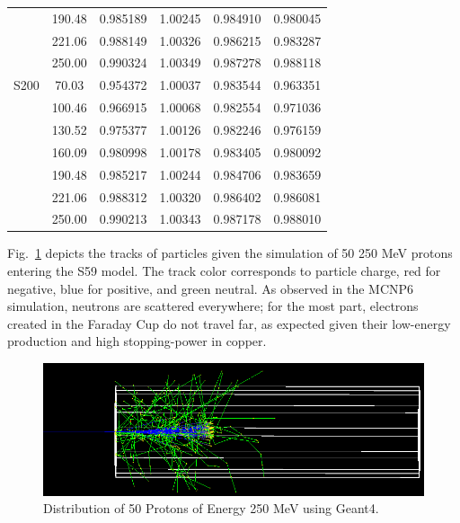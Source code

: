 \documentclass{mc2015}
\begin{document}
\begin{table}[H]
\begin{tabular}{lccccc}
        & 190.48 & \num{0.985189} & \num{1.00245} & \num{0.984910} & \num{0.980045} \\
        & 221.06 & \num{0.988149} & \num{1.00326} & \num{0.986215} & \num{0.983287} \\
        & 250.00 & \num{0.990324} & \num{1.00349} & \num{0.987278} & \num{0.988118} \\
    \midrule
    S200 & 70.03 & \num{0.954372} & \num{1.00037} & \num{0.983544} & \num{0.963351} \\
        & 100.46 & \num{0.966915} & \num{1.00068} & \num{0.982554} & \num{0.971036} \\
        & 130.52 & \num{0.975377} & \num{1.00126} & \num{0.982246} & \num{0.976159} \\
        & 160.09 & \num{0.980998} & \num{1.00178} & \num{0.983405} & \num{0.980092} \\
        & 190.48 & \num{0.985217} & \num{1.00244} & \num{0.984706} & \num{0.983659} \\
        & 221.06 & \num{0.988312} & \num{1.00320} & \num{0.986402} & \num{0.986081} \\
        & 250.00 & \num{0.990213} & \num{1.00343} & \num{0.987178} & \num{0.988010} \\
    \bottomrule
  \end{tabular}
  \label{tab:geant4_data}
\end{table}

Fig.~\ref{fig:G4_dist} depicts the tracks of particles given the simulation of 50 250 MeV protons entering the S59 model.  The track color corresponds to particle charge, red for negative, blue for positive, and green neutral.  As observed in the MCNP6 simulation, neutrons are scattered everywhere; for the most part, electrons created in the Faraday Cup do not travel far, as expected given their low-energy production and high stopping-power in copper.

\begin{figure}[H]
  \centering
  \includegraphics[width=5in]{figures/fig_G4_dist.png}
  \caption{Distribution of 50 Protons of Energy 250 MeV using Geant4.}
  \label{fig:G4_dist}
\end{figure}
\end{document}
